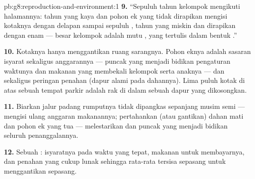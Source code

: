 \begin{solution}{pb:g8:reproduction-and-environment:1}
\textbf{9.} ``Sepuluh tahun kelompok  mengikuti halamannya:
tahun yang kaya  dan pohon ek yang tidak dirapikan mengisi
kotaknya dengan delapan sampai sepuluh , tahun yang miskin dan
dirapikan dengan enam --- besar kelompok  adalah mutu ,
yang tertulis dalam bentuk .''

\textbf{10.} Kotaknya hanya menggantikan ruang sarangnya. Pohon eknya
adalah sasaran isyarat sekaligus anggarannya --- puncak  yang
menjadi bidikan pengaturan waktunya dan makanan yang membekali
kelompok  serta anaknya --- dan sekaligus peringan penahan (dapur
alami pada dahannya). Lima puluh kotak di atas sebuah tempat parkir
adalah rak di dalam sebuah dapur yang dikosongkan.

\textbf{11.} Biarkan jalur padang rumputnya tidak dipangkas sepanjang
musim semi --- mengisi ulang anggaran makanannya; pertahankan (atau
gantikan) dahan mati dan pohon ek yang tua --- melestarikan 
dan puncak yang menjadi bidikan seluruh penanggalannya.

\textbf{12.} Sebuah : isyaratnya pada waktu yang tepat,
makanan untuk membayarnya, dan penahan yang cukup lunak sehingga
rata-rata tersisa sepasang untuk menggantikan sepasang.
\end{solution}
